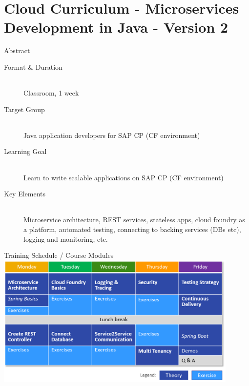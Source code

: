 \part{Cloud Curriculum - Microservices Development in Java - Version 2}
\begin{frame}{Abstract}
\begin{description}
\item[Format \& Duration] ~\\Classroom, 1 week
\item[Target Group] ~\\Java application developers for SAP CP (CF environment)
\item[Learning Goal] ~\\Learn to write scalable applications on SAP CP (CF environment)
\item[Key Elements] ~\\Microservice architecture, REST services, stateless apps, cloud foundry as a platform, automated testing, connecting to backing services (DBs etc), logging and monitoring, etc.
\end{description}
\vfill
{}
\end{frame}

\begin{frame}{Training Schedule / Course Modules}
\vfill
\includegraphics[width=0.9\textwidth]{../Abstract/images/Java_CoursePlan_Simple}
\vfill
{}
\end{frame}

